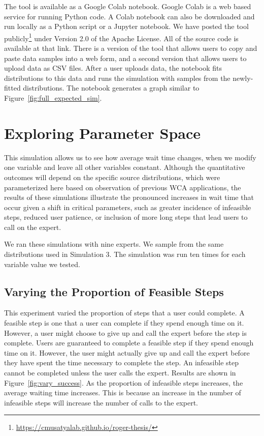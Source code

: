 The tool is available as a Google Colab notebook.
Google Colab is a web based service for running Python code.
A Colab notebook can also be downloaded and run locally as a Python script or a
Jupyter notebook.
We have posted the tool
publicly\footnote{\url{https://cmusatyalab.github.io/roger-thesis/}} under
Version 2.0 of the Apache License.
All of the source code is available at that link.
There is a version of the tool that allows users to copy and paste data samples
into a web form, and a second version that allows users to upload data as CSV
files.
After a user uploads data, the notebook fits distributions to this data and
runs the simulation with samples from the newly-fitted distributions.
The notebook generates a graph similar to Figure~\ref{fig:full_expected_sim}.

\section{Exploring Parameter Space}

This simulation allows us to see how average wait time changes, when we modify
one variable and leave all other variables constant.
Although the quantitative outcomes will depend on the specific source
distributions, which were parameterized here based on observation of previous
WCA applications, the results of these simulations illustrate the pronounced
increases in wait time that occur given a shift in critical parameters, such as
greater incidence of infeasible steps, reduced user patience, or inclusion of
more long steps that lead users to call on the expert.

We ran these simulations with nine experts.
We sample from the same distributions used in Simulation 3.
The simulation was run ten times for each variable value we tested.

\subsection{Varying the Proportion of Feasible Steps}\label{sec:feasible}

This experiment varied the proportion of steps that a user could complete.
A feasible step is one that a user can complete if they spend enough time on it.
However, a user might choose to give up and call the expert before the step is
complete.
Users are guaranteed to complete a feasible step if they spend enough time on
it.
However, the user might actually give up and call the expert before they have
spent the time necessary to complete the step.
An infeasible step cannot be completed unless the user calls the expert.
Results are shown in Figure~\ref{fig:vary_success}.
As the proportion of infeasible steps increases, the average waiting time
increases.
This is because an increase in the number of infeasible steps will increase the
number of calls to the expert.


